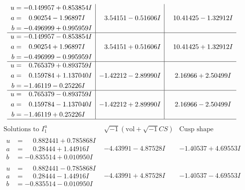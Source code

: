 \documentclass[1p]{elsarticle_modified}
\theoremstyle{definition}
\newcommand{\I}{\sqrt{-1}}
\begin{document}
$$\begin{array}{c|c|c}
\begin{aligned}
u &= -0.149957 + 0.853854 I \\
a &= \phantom{-}0.90254 - 1.96897 I \\
b &= -0.496999 + 0.995959 I\end{aligned}
 & \phantom{-}3.54151 - 0.51606 I & \phantom{-}10.41425 - 1.32912 I \\ \hline\begin{aligned}
u &= -0.149957 - 0.853854 I \\
a &= \phantom{-}0.90254 + 1.96897 I \\
b &= -0.496999 - 0.995959 I\end{aligned}
 & \phantom{-}3.54151 + 0.51606 I & \phantom{-}10.41425 + 1.32912 I \\ \hline\begin{aligned}
u &= \phantom{-}0.765379 + 0.893759 I \\
a &= \phantom{-}0.159784 + 1.137040 I \\
b &= -1.46119 - 0.25226 I\end{aligned}
 & -1.42212 - 2.89990 I & \phantom{-}2.16966 + 2.50499 I \\ \hline\begin{aligned}
u &= \phantom{-}0.765379 - 0.893759 I \\
a &= \phantom{-}0.159784 - 1.137040 I \\
b &= -1.46119 + 0.25226 I\end{aligned}
 & -1.42212 + 2.89990 I & \phantom{-}2.16966 - 2.50499 I\\
 \hline 
 \end{array}$$\newpage$$\begin{array}{c|c|c}  
\text{Solutions to }I^u_{1}& \I (\text{vol} + \sqrt{-1}CS) & \text{Cusp shape}\\
 \hline 
\begin{aligned}
u &= \phantom{-}0.882441 + 0.785868 I \\
a &= \phantom{-}0.28444 + 1.44916 I \\
b &= -0.835514 + 0.010950 I\end{aligned}
 & -4.43991 - 4.87528 I & -1.40537 + 4.69553 I \\ \hline\begin{aligned}
u &= \phantom{-}0.882441 - 0.785868 I \\
a &= \phantom{-}0.28444 - 1.44916 I \\
b &= -0.835514 - 0.010950 I\end{aligned}
 & -4.43991 + 4.87528 I & -1.40537 - 4.69553 I \\ \hline\begin{aligned}

\end{aligned}
\end{array}$$
\end{document}
